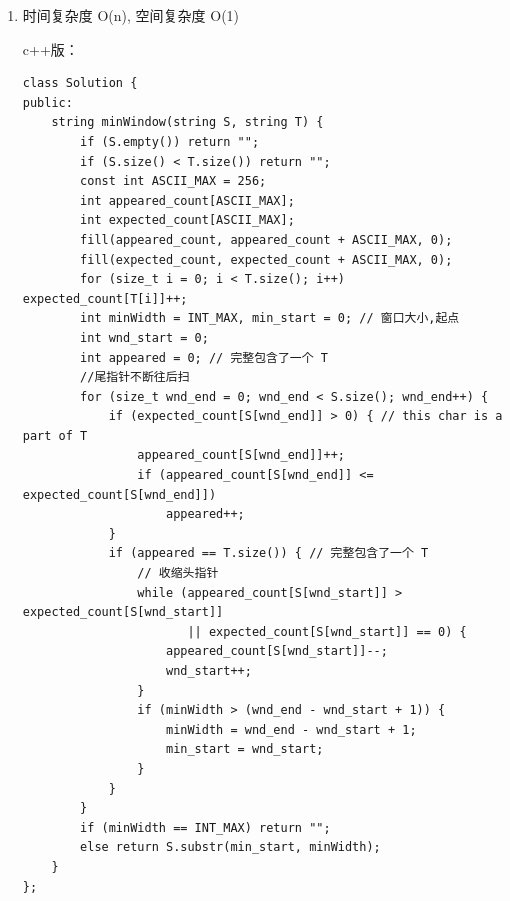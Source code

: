 \documentclass[12pt]{book}
\begin{document}
\begin{enumerate}
\item 时间复杂度 O(n), 空间复杂度 O(1)
\label{sec-15-3-4-1}

c++版：
\lstset{language=java,label= ,caption= ,numbers=none}
\begin{lstlisting}
class Solution {
public:
    string minWindow(string S, string T) {
        if (S.empty()) return "";
        if (S.size() < T.size()) return "";
        const int ASCII_MAX = 256;
        int appeared_count[ASCII_MAX];
        int expected_count[ASCII_MAX];
        fill(appeared_count, appeared_count + ASCII_MAX, 0);
        fill(expected_count, expected_count + ASCII_MAX, 0);
        for (size_t i = 0; i < T.size(); i++) expected_count[T[i]]++;
        int minWidth = INT_MAX, min_start = 0; // 窗口大小,起点
        int wnd_start = 0;
        int appeared = 0; // 完整包含了一个 T
        //尾指针不断往后扫
        for (size_t wnd_end = 0; wnd_end < S.size(); wnd_end++) {
            if (expected_count[S[wnd_end]] > 0) { // this char is a part of T
                appeared_count[S[wnd_end]]++;
                if (appeared_count[S[wnd_end]] <= expected_count[S[wnd_end]])
                    appeared++;
            }
            if (appeared == T.size()) { // 完整包含了一个 T
                // 收缩头指针
                while (appeared_count[S[wnd_start]] > expected_count[S[wnd_start]]
                       || expected_count[S[wnd_start]] == 0) {
                    appeared_count[S[wnd_start]]--;
                    wnd_start++;
                }
                if (minWidth > (wnd_end - wnd_start + 1)) {
                    minWidth = wnd_end - wnd_start + 1;
                    min_start = wnd_start;
                }
            }
        }
        if (minWidth == INT_MAX) return "";
        else return S.substr(min_start, minWidth);
    }
};
\end{lstlisting}


\end{enumerate}
\end{document}
